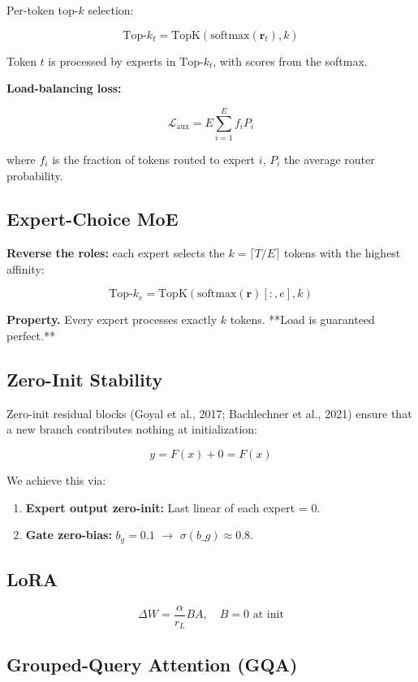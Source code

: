 Per-token top-$k$ selection:

\[
\text{Top-}k_t = \text{TopK}(\text{softmax}(\mathbf{r}_t), k)
\tag{3.5}
\]

Token $t$ is processed by experts in $\text{Top-}k_t$, with scores from the 
softmax.

\textbf{Load-balancing loss:}

\[
\mathcal{L}_\text{aux} = E \sum_{i=1}^{E} f_i P_i
\tag{3.6}
\]

where $f_i$ is the fraction of tokens routed to expert $i$, $P_i$ the 
average router probability.

\subsection{Expert-Choice MoE}

\textbf{Reverse the roles:} each expert selects the $k = \lceil T / E \rceil$ 
tokens with the highest affinity:

\[
\text{Top-}k_e = \text{TopK}\!\left(\text{softmax}(\mathbf{r})[:, e], k\right)
\tag{3.7}
\]

\textbf{Property.} Every expert processes exactly $k$ tokens. **Load is 
guaranteed perfect.**

\subsection{Zero-Init Stability}

Zero-init residual blocks (Goyal et al., 2017; Bachlechner et al., 2021) 
ensure that a new branch contributes nothing at initialization:

\[
y = F(x) + 0 = F(x)
\tag{3.8}
\]

We achieve this via:

\begin{enumerate}
\item \textbf{Expert output zero-init:} Last linear of each expert = 0.
\item \textbf{Gate zero-bias:} $b_g = 0.1$ $\to$ $\sigma(b\_g) \approx
  0.8$.

\end{enumerate}
\subsection{LoRA}

\[
\Delta W = \frac{\alpha}{r_L} B A, \quad B = 0 \text{ at init}
\tag{3.9}
\]

\subsection{Grouped-Query Attention (GQA)}

